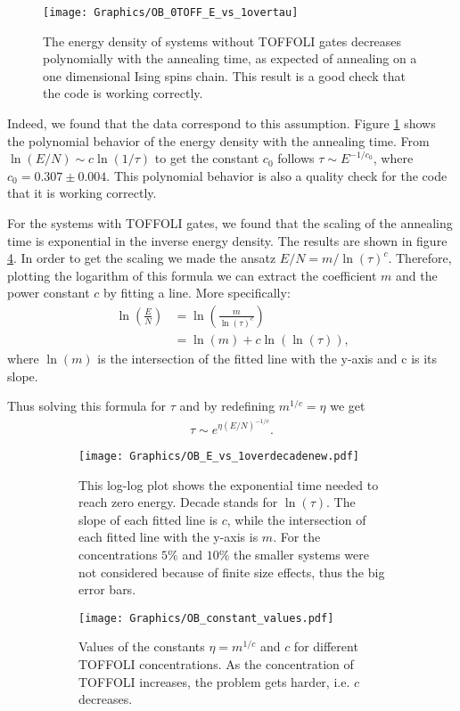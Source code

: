 \begin{figure}[hbtp]
  \centering
  \texttt{[image: Graphics/OB\_0TOFF\_E\_vs\_1overtau]}
  \caption{The energy density of systems without TOFFOLI gates decreases polynomially with the annealing time, as expected of annealing on a one dimensional Ising spins chain. This result is a good check that the code is working correctly.}
  \label{fig:OB_0TOFF_codecheck}
\end{figure}

Indeed, we found that the data correspond to this assumption.
Figure \ref{fig:OB_0TOFF_codecheck} shows the polynomial behavior of the energy density with the annealing time.
From $\ln (E/N) \sim c \ln(1/\tau)$ to get the constant $c_0$ follows $\tau \sim E^{-1/c_0}$, where $c_0=0.307\pm 0.004$.
This polynomial behavior is also a quality check for the code that it is working correctly.

For the systems with TOFFOLI gates, we found that the scaling of the annealing time is exponential in the inverse energy density.
The results are shown in figure \ref{fig:OB_TOFF}.
In order to get the scaling we made the ansatz $E/N = m/\ln(\tau)^c$.
Therefore, plotting the logarithm of this formula we can extract the coefficient $m$ and the power constant $c$ by fitting a line.
More specifically:
\begin{align}
  \ln \left(\frac{E}{N}\right) &= \ln \left(\frac{m}{\ln( \tau)^c} \right)\\
  &= \ln(m) + c \ln(\ln(\tau)) \text{,}
\end{align}
where $\ln(m)$ is the intersection of the fitted line with the y-axis and c is its slope.

Thus solving this formula for $\tau$ and by redefining $m^{1/c}=\eta$ we get
\begin{align}
  \tau \sim e^{\eta \left(E/N\right)^{-1/c}}.
\end{align}


\begin{figure}[hbtp]
  \begin{subfigure}{.5\textwidth}
    \texttt{[image: Graphics/OB\_E\_vs\_1overdecadenew.pdf]}
    \caption{This log-log plot shows the exponential time needed to reach zero energy. Decade stands for $\ln(\tau)$. The slope of each fitted line is $c$, while the intersection of each fitted line with the y-axis is $m$. For the concentrations $5\%$ and $10\%$ the smaller systems were not considered because of finite size effects, thus the big error bars.}
    \label{fig:OB_E_vs_1overdecade}
  \end{subfigure}
  \begin{subfigure}{.5\textwidth}
    \texttt{[image: Graphics/OB\_constant\_values.pdf]}
    \caption{Values of the constants $\eta=m^{1/c}$ and $c$ for different TOFFOLI concentrations. As the concentration of TOFFOLI increases, the problem gets harder, i.e. $c$ decreases.}
    \label{fig:OB_constant_values}
  \end{subfigure}
  \caption{}
  \label{fig:OB_TOFF}
\end{figure}


